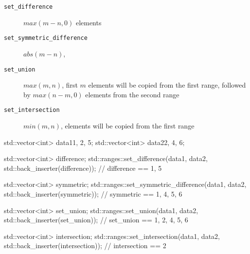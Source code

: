 \begin{description}
   \item[\texttt{set\_difference}] $max(m-n,0)$ elements
   \item[\texttt{set\_symmetric\_difference}] $abs(m-n)$, 
   \item[\texttt{set\_union}] $max(m,n)$, first $m$ elements will be copied from the first range, followed by $max(n-m,0)$ elements from the second range
   \item[\texttt{set\_intersection}] $min(m,n)$, elements will be copied from the first range
\end{description}

\begin{box-note}
\begin{cppcode}
std::vector<int> data1{1, 2, 5};
std::vector<int> data2{2, 4, 6};

std::vector<int> difference;
std::ranges::set_difference(data1, data2, std::back_inserter(difference));
// difference == {1, 5}

std::vector<int> symmetric;
std::ranges::set_symmetric_difference(data1, data2, std::back_inserter(symmetric));
// symmetric == {1, 4, 5, 6}

std::vector<int> set_union;
std::ranges::set_union(data1, data2, std::back_inserter(set_union));
// set_union == {1, 2, 4, 5, 6}

std::vector<int> intersection;
std::ranges::set_intersection(data1, data2, std::back_inserter(intersection));
// intersection == {2}
\end{cppcode}
\end{box-note}